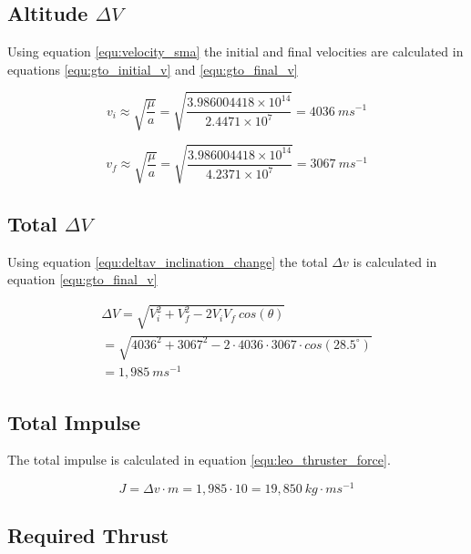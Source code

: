 \documentclass[a4paper, article, oneside, UKenglish]{memoir}
\newcommand{\0}{\mathbf{0}}
\newcommand{\1}{\mathbf{1}}
\begin{document}
\subsection{Altitude $\Delta V$}

Using equation \ref{equ:velocity_sma} the initial and final velocities are calculated in equations \ref{equ:gto_initial_v} and \ref{equ:gto_final_v}

\begin{equation}
v_i \approx \sqrt{ \frac{ \mu }{a} } = \sqrt{ \frac{ 3.986004418 \times 10^{14} }{2.4471 \times 10^{7}} } = 4036~ms^{-1}
\label{equ:gto_initial_v}
\end{equation}

\begin{equation}
v_f \approx \sqrt{ \frac{ \mu }{a} } = \sqrt{ \frac{ 3.986004418 \times 10^{14} }{4.2371 \times 10^{7}} } = 3067~ms^{-1} 
\label{equ:gto_final_v}
\end{equation}


\subsection{Total $\Delta V$}

Using equation \ref{equ:deltav_inclination_change} the total $ \Delta v $ is calculated in equation \ref{equ:gto_final_v}

\begin{equation}
\begin{split}
\Delta V = \sqrt{ V_i^2 + V_f^2 - 2 V_i V_f ~ cos( \theta ) } \\ 
= \sqrt{ 4036^2 + 3067^2 - 2 \cdot 4036 \cdot 3067 \cdot cos( 28.5^{\circ} ) } \\
= 1,985~ms^{-1}
\end{split}
\label{equ:gto_deltav}
\end{equation}


\subsection{Total Impulse}

The total impulse is calculated in equation \ref{equ:leo_thruster_force}.

\begin{equation}
J = \Delta v \cdot m = 1,985 \cdot 10 = 19,850 ~ kg \cdot ms^{-1}
\label{equ:gto_total_impulse}
\end{equation}


\subsection{Required Thrust}
\end{document}
